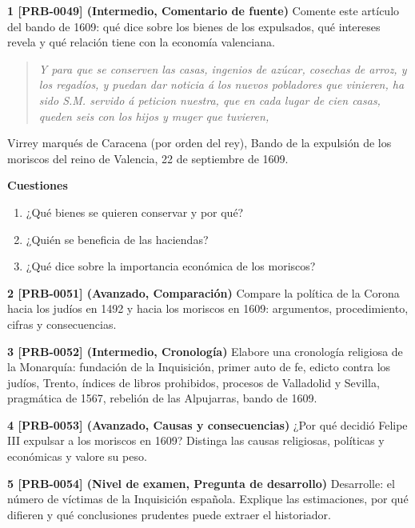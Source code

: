 \documentclass{book}
\begin{document}
\begin{tcolorbox}[title={Ejercicios}, studiumworked, breakable]

\noindent\textbf{1 [PRB-0049] (Intermedio, Comentario de fuente)}
Comente este artículo del bando de 1609: qué dice sobre los bienes de los expulsados, qué intereses revela y qué relación tiene con la economía valenciana.


\begin{quote}
\itshape Y para que se conserven las casas, ingenios de azúcar, cosechas de arroz, y los regadíos, y puedan dar noticia á los nuevos pobladores que vinieren, ha sido S.M. servido á peticion nuestra, que en cada lugar de cien casas, queden seis con los hijos y muger que tuvieren,
\end{quote}
{\noindent\footnotesize Virrey marqués de Caracena (por orden del rey), Bando de la expulsión de los moriscos del reino de Valencia, 22 de septiembre de 1609.\par}

\noindent\textbf{Cuestiones}
\begin{enumerate}
\item ¿Qué bienes se quieren conservar y por qué?
\item ¿Quién se beneficia de las haciendas?
\item ¿Qué dice sobre la importancia económica de los moriscos?
\end{enumerate}

\noindent\textbf{2 [PRB-0051] (Avanzado, Comparación)}
Compare la política de la Corona hacia los judíos en 1492 y hacia los moriscos en 1609: argumentos, procedimiento, cifras y consecuencias.


\noindent\textbf{3 [PRB-0052] (Intermedio, Cronología)}
Elabore una cronología religiosa de la Monarquía: fundación de la Inquisición, primer auto de fe, edicto contra los judíos, Trento, índices de libros prohibidos, procesos de Valladolid y Sevilla, pragmática de 1567, rebelión de las Alpujarras, bando de 1609.


\noindent\textbf{4 [PRB-0053] (Avanzado, Causas y consecuencias)}
¿Por qué decidió Felipe III expulsar a los moriscos en 1609? Distinga las causas religiosas, políticas y económicas y valore su peso.


\noindent\textbf{5 [PRB-0054] (Nivel de examen, Pregunta de desarrollo)}
Desarrolle: el número de víctimas de la Inquisición española. Explique las estimaciones, por qué difieren y qué conclusiones prudentes puede extraer el historiador.

\end{tcolorbox}
\end{document}
